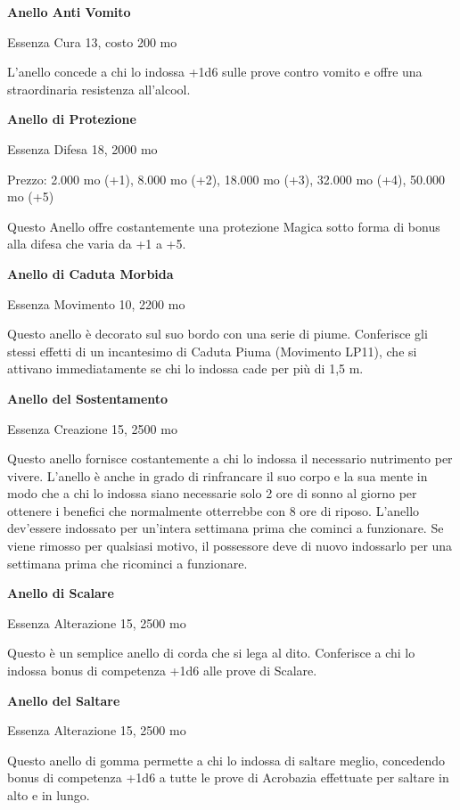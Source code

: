 \documentclass[a4paper,11pt,twoside,openany]{book}
\begin{document}
\pagebreak

\textbf{Anello Anti Vomito}

Essenza Cura 13, costo 200 mo

L'anello concede a chi lo indossa +1d6 sulle prove contro vomito e offre una straordinaria resistenza all'alcool.

\textbf{Anello di Protezione}

Essenza Difesa 18, 2000 mo

Prezzo: 2.000 mo (+1), 8.000 mo (+2), 18.000 mo (+3), 32.000 mo (+4),
50.000 mo (+5)

Questo Anello offre costantemente una protezione Magica sotto forma di bonus alla difesa che varia da +1 a +5.

\textbf{Anello di Caduta Morbida}

Essenza Movimento 10, 2200 mo

Questo anello è decorato sul suo bordo con una serie di piume. Conferisce gli stessi effetti di un incantesimo di Caduta Piuma (Movimento LP11), che si attivano immediatamente se chi lo indossa cade per più di 1,5 m.

\textbf{Anello del Sostentamento}

Essenza Creazione 15, 2500 mo

Questo anello fornisce costantemente a chi lo indossa il necessario nutrimento per vivere. L'anello è anche in grado di rinfrancare il suo corpo e la sua mente in modo che a chi lo indossa siano necessarie solo 2 ore di sonno al giorno per ottenere i benefici che normalmente otterrebbe con 8 ore di riposo. L'anello dev'essere indossato per un'intera settimana prima che cominci a funzionare. Se viene rimosso per qualsiasi motivo, il possessore deve di nuovo indossarlo per una settimana prima che ricominci a funzionare.

\textbf{Anello di Scalare}

Essenza Alterazione 15, 2500 mo

Questo è un semplice anello di corda che si lega al dito. Conferisce a chi lo indossa bonus di competenza +1d6 alle prove di Scalare.

\textbf{Anello del Saltare}

Essenza Alterazione 15, 2500 mo

Questo anello di gomma permette a chi lo indossa di saltare meglio, concedendo bonus di competenza +1d6 a tutte le prove di Acrobazia effettuate per saltare in alto e in lungo.
\end{document}
